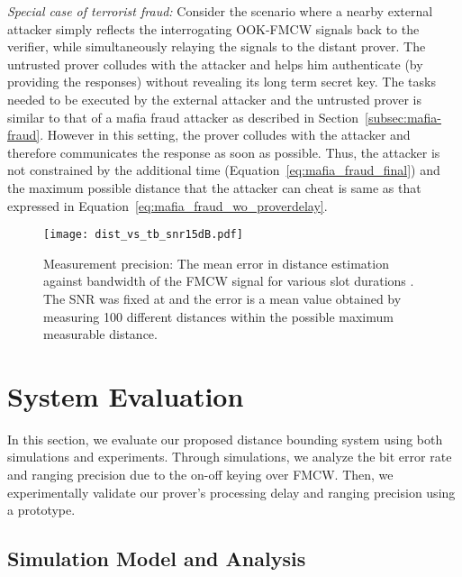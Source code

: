 \documentclass{sig-alternate-10pt}
\begin{document}
\emph{Special case of terrorist fraud:} Consider the scenario where a nearby
external attacker simply reflects the interrogating OOK-FMCW signals back to the
verifier, while simultaneously relaying the signals to the distant prover. The
untrusted prover colludes with the attacker and helps him authenticate (by
providing the responses) without revealing its long term secret key. The tasks
needed to be executed by the external attacker and the untrusted prover is
similar to that of a mafia fraud attacker as described in
Section~\ref{subsec:mafia-fraud}. However in this setting, the prover colludes
with the attacker and therefore communicates the response as soon as possible.
Thus, the attacker is not constrained by the additional time 
(Equation~\eqref{eq:mafia_fraud_final}) and the maximum possible distance that
the attacker can cheat is same as that expressed in
Equation~\eqref{eq:mafia_fraud_wo_proverdelay}.

\begin{figure}[t]
  \centering
  \texttt{[image: dist\_vs\_tb\_snr15dB.pdf]}
  \caption{Measurement precision: The mean error in distance estimation against
    bandwidth of the FMCW signal for various slot durations . The SNR was
    fixed at  and the error is a mean value obtained by measuring
    100 different distances within the possible maximum measurable distance.}
  \label{fig:dist_bw_plot}
\end{figure}



\section{System Evaluation}
\label{sec:system-evaluation}

In this section, we evaluate our proposed distance bounding system using both
simulations and experiments. Through simulations, we analyze the bit error rate
and ranging precision due to the on-off keying over FMCW. Then, we
experimentally validate our prover's processing delay and ranging precision
using a prototype.

\subsection{Simulation Model and Analysis}
\label{sec:simulation-setup}
\end{document}
